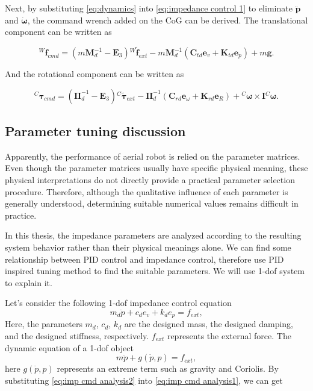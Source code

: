 Next, by substituting \eqref{eq:dynamics} into \eqref{eq:impedance control 1} to eliminate $\ddot{\boldsymbol{p}}$ and $\dot{\boldsymbol{\omega}}$, the command wrench added on the CoG can be derived. The translational component can be written as

\begin{equation}
\label{eq:imp cmd for trans1}
    {^W\!\boldsymbol{f}_{cmd}}=(m\boldsymbol{M}^{-1}_d-\boldsymbol{E}_3){^W\!\boldsymbol{\tilde{f}}_{ext}}-m\boldsymbol{M}_d^{-1}({\boldsymbol{C}_{td}}{\boldsymbol{e}_v}+{\boldsymbol{K}_{td}}{\boldsymbol{e}_p})+m\boldsymbol{g}.
\end{equation}

And the rotational component can be written as

\begin{equation}
\label{eq:imp cmd for rot1}
    {^{C}\boldsymbol{\tau}_{cmd}}=(\boldsymbol{I}\boldsymbol{I}^{-1}_d-\boldsymbol{E}_3){^{C}}\boldsymbol{\tilde{\tau}}_{ext}-\boldsymbol{I}\boldsymbol{I}^{-1}_d({\boldsymbol{C}_{rd}}{\boldsymbol{e}_\omega}+{\boldsymbol{K}_{rd}}{\boldsymbol{e}_R})+{^{C}\boldsymbol{\omega}} \times \boldsymbol{I}{^{C}\boldsymbol{\omega}}.
\end{equation}
 
\subsection{Parameter tuning discussion}
Apparently, the performance of aerial robot is relied on the parameter matrices. Even though the parameter matrices usually have specific physical meaning, these physical interpretations do not directly provide a practical parameter selection procedure. Therefore, although the qualitative influence of each parameter is generally understood, determining suitable numerical values remains difficult in practice. 

In this thesis, the impedance parameters are analyzed according to the resulting system behavior rather than their physical meanings alone. We can find some relationship between PID control and impedance control, therefore use PID inspired tuning method to find the suitable parameters. We will use 1-dof system to explain it.

Let's consider the following 1-dof impedance control equation
\begin{equation}
\label{eq:imp cmd analysis1}
  m_d\ddot{p}+c_de_v+k_de_p = f_{ext},
\end{equation}
Here, the parameters $m_d$, $c_d$, $k_d$ are the designed mass, the designed damping, and the designed stiffness, respectively. $f_{ext}$ represents the external force.
The dynamic equation of a 1-dof object
\begin{equation}
\label{eq:imp cmd analysis2}
  m\ddot{p}+g(\dot{p}, p) = f_{ext},
\end{equation}
here $g(\dot{p}, p)$ represents an extreme term such as gravity and Coriolis.
By substituting \ref{eq:imp cmd analysis2} into \ref{eq:imp cmd analysis1}, we can get

